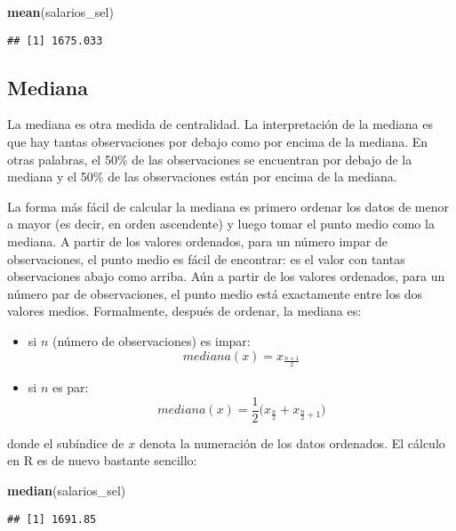 \documentclass[
]{book}
\newenvironment{Shaded}{\begin{snugshade}}{\end{snugshade}}
\newcommand{\KeywordTok}[1]{\textcolor[rgb]{0.13,0.29,0.53}{\textbf{#1}}}
\newcommand{\NormalTok}[1]{#1}
\providecommand{\tightlist}{%
  \setlength{\itemsep}{0pt}\setlength{\parskip}{0pt}}
\begin{document}
\begin{Shaded}
\begin{Highlighting}[]
\KeywordTok{mean}\NormalTok{(salarios_sel)}
\end{Highlighting}
\end{Shaded}

\begin{verbatim}
## [1] 1675.033
\end{verbatim}

\hypertarget{mediana}{%
\subsection{Mediana}\label{mediana}}

La mediana es otra medida de centralidad. La interpretación de la mediana es que hay tantas observaciones por debajo como por encima de la mediana. En otras palabras, el 50\% de las observaciones se encuentran por debajo de la mediana y el 50\% de las observaciones están por encima de la mediana.

La forma más fácil de calcular la mediana es primero ordenar los datos de menor a mayor (es decir, en orden ascendente) y luego tomar el punto medio como la mediana. A partir de los valores ordenados, para un número impar de observaciones, el punto medio es fácil de encontrar: es el valor con tantas observaciones abajo como arriba. Aún a partir de los valores ordenados, para un número par de observaciones, el punto medio está exactamente entre los dos valores medios. Formalmente, después de ordenar, la mediana es:

\begin{itemize}
\tightlist
\item
  si \(n\) (número de observaciones) es impar: \[mediana(x) = x_{\frac{n + 1}{2}}\]
\item
  si \(n\) es par: \[mediana(x) = \frac{1}{2}\big(x_{\frac{n}{2}} + x_{\frac{n}{2} + 1} \big)\]
\end{itemize}

donde el subíndice de \(x\) denota la numeración de los datos ordenados. El cálculo en R es de nuevo bastante sencillo:

\begin{Shaded}
\begin{Highlighting}[]
\KeywordTok{median}\NormalTok{(salarios_sel)}
\end{Highlighting}
\end{Shaded}

\begin{verbatim}
## [1] 1691.85
\end{verbatim}
\end{document}
